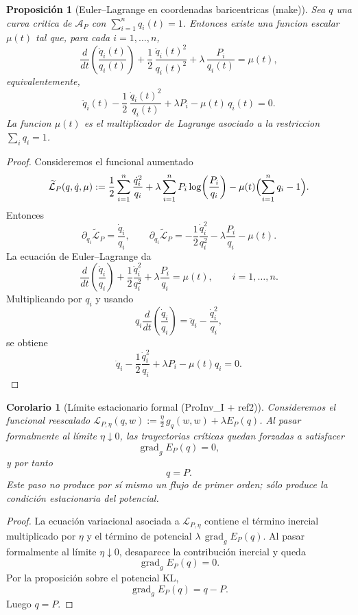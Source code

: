 ﻿\documentclass[12pt]{article}
\newcommand{\fuente}[1]{\textnormal{(#1)}}
\newtheorem{proposicion}{Proposición}[section]
\newtheorem{corolario}{Corolario}[section]
\begin{document}
\begin{proposicion}[Euler--Lagrange en coordenadas baricentricas \fuente{make}]
Sea \(q\) una curva critica de \(\mathcal A_P\) con \(\sum_{i=1}^n q_i(t)=1\). Entonces existe una funcion escalar \(\mu(t)\) tal que, para cada \(i=1,\dots,n\),
\[
\frac{d}{dt}\left(\frac{\dot q_i(t)}{q_i(t)}\right)+\frac12\,\frac{\dot q_i(t)^2}{q_i(t)^2}+\lambda\,\frac{P_i}{q_i(t)}=\mu(t),
\]
equivalentemente,
\[
\ddot q_i(t)-\frac12\,\frac{\dot q_i(t)^2}{q_i(t)}+\lambda P_i-\mu(t)\,q_i(t)=0.
\]
La funcion \(\mu(t)\) es el multiplicador de Lagrange asociado a la restriccion \(\sum_i q_i=1\).
\end{proposicion}
\begin{proof}
Consideremos el funcional aumentado
\[
\widetilde{\mathcal L}_P(q,\dot q,\mu)
:=\frac12\sum_{i=1}^n\frac{\dot q_i^2}{q_i}
+\lambda\sum_{i=1}^n P_i\log\!\left(\frac{P_i}{q_i}\right)
-\mu(t)\Bigl(\sum_{i=1}^n q_i-1\Bigr).
\]
Entonces
\[
\partial_{\dot q_i}\widetilde{\mathcal L}_P=\frac{\dot q_i}{q_i},
\qquad
\partial_{q_i}\widetilde{\mathcal L}_P
=-\frac12\frac{\dot q_i^2}{q_i^2}-\lambda\frac{P_i}{q_i}-\mu(t).
\]
La ecuación de Euler--Lagrange da
\[
\frac{d}{dt}\left(\frac{\dot q_i}{q_i}\right)
+\frac12\frac{\dot q_i^2}{q_i^2}
+\lambda\frac{P_i}{q_i}
=\mu(t),
\qquad i=1,\dots,n.
\]
Multiplicando por \(q_i\) y usando
\[
q_i\frac{d}{dt}\left(\frac{\dot q_i}{q_i}\right)=\ddot q_i-\frac{\dot q_i^2}{q_i},
\]
se obtiene
\[
\ddot q_i-\frac12\frac{\dot q_i^2}{q_i}+\lambda P_i-\mu(t)q_i=0.
\]
\end{proof}

\begin{corolario}[Límite estacionario formal \fuente{ProInv\_I + ref2}]
Consideremos el funcional reescalado \(\mathcal L_{P,\eta}(q,w):=\frac{\eta}{2}\,g_q(w,w)+\lambda E_P(q)\). Al pasar formalmente al límite \(\eta\downarrow 0\), las trayectorias críticas quedan forzadas a satisfacer
\[
\operatorname{grad}_g E_P(q)=0,
\]
y por tanto
\[
q=P.
\]
Este paso no produce por sí mismo un flujo de primer orden; sólo produce la condición estacionaria del potencial.
\end{corolario}
\begin{proof}
La ecuación variacional asociada a \(\mathcal L_{P,\eta}\) contiene el término inercial multiplicado por \(\eta\) y el término de potencial \(\lambda\,\operatorname{grad}_gE_P(q)\). Al pasar formalmente al límite \(\eta\downarrow 0\), desaparece la contribución inercial y queda
\[
\operatorname{grad}_gE_P(q)=0.
\]
Por la proposición sobre el potencial KL,
\[
\operatorname{grad}_gE_P(q)=q-P.
\]
Luego \(q=P\).
\end{proof}
\end{document}
